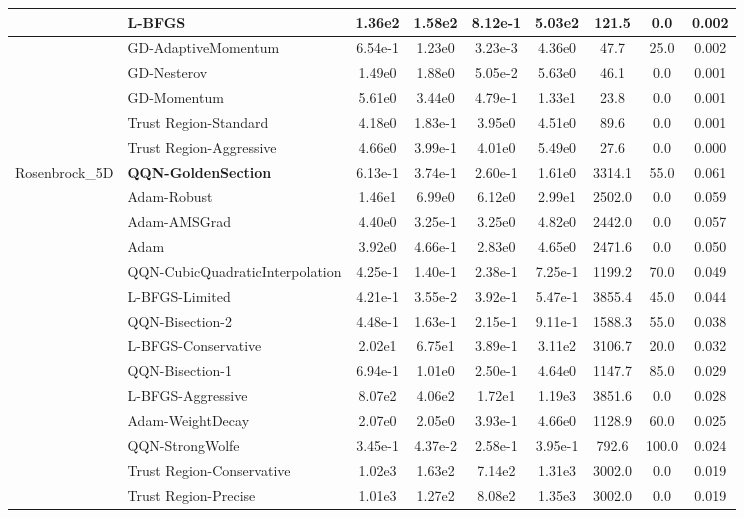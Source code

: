 \documentclass[10pt]{article}
\begin{document}
\begin{longtable}{|l|l|c|c|c|c|c|c|c|}
\hline
 & L-BFGS & 1.36e2 & 1.58e2 & 8.12e-1 & 5.03e2 & 121.5 & 0.0 & 0.002 \\
\hline
 & GD-AdaptiveMomentum & 6.54e-1 & 1.23e0 & 3.23e-3 & 4.36e0 & 47.7 & 25.0 & 0.002 \\
\hline
 & GD-Nesterov & 1.49e0 & 1.88e0 & 5.05e-2 & 5.63e0 & 46.1 & 0.0 & 0.001 \\
\hline
 & GD-Momentum & 5.61e0 & 3.44e0 & 4.79e-1 & 1.33e1 & 23.8 & 0.0 & 0.001 \\
\hline
 & Trust Region-Standard & 4.18e0 & 1.83e-1 & 3.95e0 & 4.51e0 & 89.6 & 0.0 & 0.001 \\
\hline
 & Trust Region-Aggressive & 4.66e0 & 3.99e-1 & 4.01e0 & 5.49e0 & 27.6 & 0.0 & 0.000 \\
Rosenbrock\_5D & \textbf{QQN-GoldenSection} & 6.13e-1 & 3.74e-1 & 2.60e-1 & 1.61e0 & 3314.1 & 55.0 & 0.061 \\
\hline
 & Adam-Robust & 1.46e1 & 6.99e0 & 6.12e0 & 2.99e1 & 2502.0 & 0.0 & 0.059 \\
\hline
 & Adam-AMSGrad & 4.40e0 & 3.25e-1 & 3.25e0 & 4.82e0 & 2442.0 & 0.0 & 0.057 \\
\hline
 & Adam & 3.92e0 & 4.66e-1 & 2.83e0 & 4.65e0 & 2471.6 & 0.0 & 0.050 \\
\hline
 & QQN-CubicQuadraticInterpolation & 4.25e-1 & 1.40e-1 & 2.38e-1 & 7.25e-1 & 1199.2 & 70.0 & 0.049 \\
\hline
 & L-BFGS-Limited & 4.21e-1 & 3.55e-2 & 3.92e-1 & 5.47e-1 & 3855.4 & 45.0 & 0.044 \\
\hline
 & QQN-Bisection-2 & 4.48e-1 & 1.63e-1 & 2.15e-1 & 9.11e-1 & 1588.3 & 55.0 & 0.038 \\
\hline
 & L-BFGS-Conservative & 2.02e1 & 6.75e1 & 3.89e-1 & 3.11e2 & 3106.7 & 20.0 & 0.032 \\
\hline
 & QQN-Bisection-1 & 6.94e-1 & 1.01e0 & 2.50e-1 & 4.64e0 & 1147.7 & 85.0 & 0.029 \\
\hline
 & L-BFGS-Aggressive & 8.07e2 & 4.06e2 & 1.72e1 & 1.19e3 & 3851.6 & 0.0 & 0.028 \\
\hline
 & Adam-WeightDecay & 2.07e0 & 2.05e0 & 3.93e-1 & 4.66e0 & 1128.9 & 60.0 & 0.025 \\
\hline
 & QQN-StrongWolfe & 3.45e-1 & 4.37e-2 & 2.58e-1 & 3.95e-1 & 792.6 & 100.0 & 0.024 \\
\hline
 & Trust Region-Conservative & 1.02e3 & 1.63e2 & 7.14e2 & 1.31e3 & 3002.0 & 0.0 & 0.019 \\
\hline
 & Trust Region-Precise & 1.01e3 & 1.27e2 & 8.08e2 & 1.35e3 & 3002.0 & 0.0 & 0.019 \\

\end{longtable}
\end{document}
